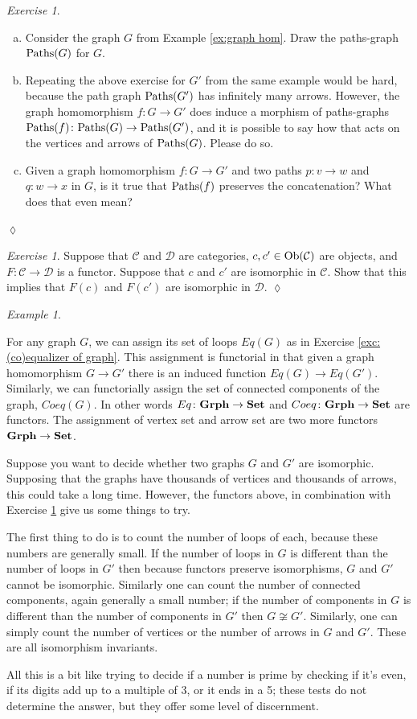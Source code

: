 \documentclass{book}
\def\tn{\textnormal}
\def\mc{\mathcal}
\def\Paths{\tn{Paths}}
\def\Ob{\tn{Ob}}
\def\to{\rightarrow}
\def\taking{\colon}
\def\iso{\cong}
\def\Grph{{\bf Grph}}
\def\Set{{\bf Set}}
\def\mcC{\mc{C}}
\def\mcD{\mc{D}}
\theoremstyle{remark}
\newtheorem{example}[subsubsection]{Example}
\newtheorem{exc}[subsubsection]{Exercise}
\newenvironment{exercise}{\begin{exc}}{\hspace*{\fill}$\lozenge$\end{exc}}
\theoremstyle{definition}
\def\sexc{\begin{enumerate}[a.)]\setlength{\itemsep}{.1cm}\setlength{\parskip}{.1cm}\item}
\def\next{\item}
\def\endsexc{\end{enumerate}}
\begin{document}
\begin{exercise}\label{exc:morphisms on paths-graphs}~
\sexc Consider the graph $G$ from Example \ref{ex:graph hom}. Draw the paths-graph $\Paths(G)$ for $G$. 
\next Repeating the above exercise for $G'$ from the same example would be hard, because the path graph $\Paths(G')$ has infinitely many arrows. However, the graph homomorphism $f\taking G\to G'$ does induce a morphism of paths-graphs $\Paths(f)\taking\Paths(G)\to\Paths(G')$, and it is possible to say how that acts on the vertices and arrows of $\Paths(G)$. Please do so.
\next Given a graph homomorphism $f\taking G\to G'$ and two paths $p\taking v\to w$ and $q\taking w\to x$ in $G$, is it true that $\Paths(f)$ preserves the concatenation? What does that even mean?
\endsexc
\end{exercise}

\begin{exercise}\label{exc:functors preserve isos}
Suppose that $\mcC$ and $\mcD$ are categories, $c,c'\in\Ob(\mcC)$ are objects, and $F\taking\mcC\to\mcD$ is a functor. Suppose that $c$ and $c'$ are isomorphic in $\mcC$. Show that this implies that $F(c)$ and $F(c')$ are isomorphic in $\mcD$.
\end{exercise}

\begin{example}\label{ex:non-isomorphism of graphs via functors}

For any graph $G$, we can assign its set of loops $Eq(G)$ as in Exercise \ref{exc:(co)equalizer of graph}. This assignment is functorial in that given a graph homomorphism $G\to G'$ there is an induced function $Eq(G)\to Eq(G')$. Similarly, we can functorially assign the set of connected components of the graph, $Coeq(G)$. In other words $Eq\taking\Grph\to\Set$ and $Coeq\taking\Grph\to\Set$ are functors. The assignment of vertex set and arrow set are two more functors $\Grph\to\Set$.

Suppose you want to decide whether two graphs $G$ and $G'$ are isomorphic. Supposing that the graphs have thousands of vertices and thousands of arrows, this could take a long time. However, the functors above, in combination with Exercise \ref{exc:functors preserve isos} give us some things to try.

The first thing to do is to count the number of loops of each, because these numbers are generally small. If the number of loops in $G$ is different than the number of loops in $G'$ then because functors preserve isomorphisms, $G$ and $G'$ cannot be isomorphic. Similarly one can count the number of connected components, again generally a small number; if the number of components in $G$ is different than the number of components in $G'$ then $G\not\iso G'$. Similarly, one can simply count the number of vertices or the number of arrows in $G$ and $G'$. These are all isomorphism invariants.  

All this is a bit like trying to decide if a number is prime by checking if it's even, if its digits add up to a multiple of 3, or it ends in a 5; these tests do not determine the answer, but they offer some level of discernment.

\end{example}
\end{document}
